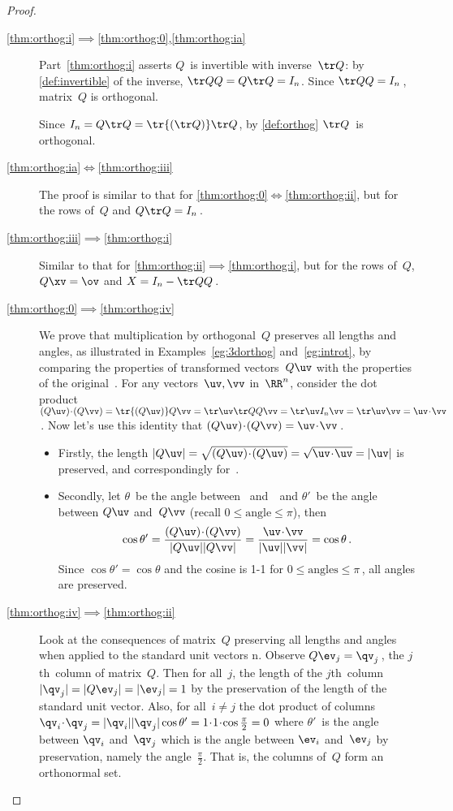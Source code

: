 \begin{proof}
\begin{description}
\item[\ref{thm:orthog:i}$\implies$\ref{thm:orthog:0},\ref{thm:orthog:ia}]
Part~\ref{thm:orthog:i} asserts \(Q\)~is invertible with inverse~\(\tr Q\): by \autoref{def:invertible} of the inverse, \(\tr QQ=Q\tr Q=I_n\).  
Since \(\tr QQ=I_n\)\,, matrix~\(Q\) is orthogonal.
 
Since \(I_n=Q\tr Q=\tr{(\tr Q)}\tr Q\), by \autoref{def:orthog} \(\tr Q\)~is orthogonal.

\item[\ref{thm:orthog:ia}$\iff$\ref{thm:orthog:iii}] 
The proof is similar to that for \ref{thm:orthog:0}$\iff$\ref{thm:orthog:ii}, but for the rows of~\(Q\) and \(Q\tr Q=I_n\)\,.

\item[\ref{thm:orthog:iii}$\implies$\ref{thm:orthog:i}] 
Similar to that for \ref{thm:orthog:ii}$\implies$\ref{thm:orthog:i}, but for the rows of~\(Q\), \(Q\xv=\ov\) and \(X=I_n-\tr QQ\)\,.

\item[\ref{thm:orthog:0}$\implies$\ref{thm:orthog:iv}] 
We prove that multiplication by orthogonal~\(Q\) preserves all lengths and angles, as illustrated in Examples~\ref{eg:3dorthog} and~\ref{eg:introt}, by comparing the properties of transformed vectors~\(Q\uv\) with the properties of the original~\uv.
For any vectors~\(\uv,\vv\) in~\(\RR^n\), consider the dot product
\((Q\uv)\cdot(Q\vv)=\tr{(Q\uv)}Q\vv
=\tr\uv\tr QQ\vv
=\tr\uv I_n\vv
=\tr\uv\vv=\uv\cdot\vv\)\,.  
Now let's use this identity that \((Q\uv)\cdot(Q\vv)=\uv\cdot\vv\)\,.
\begin{itemize}
\item Firstly, the length \(|Q\uv|=\sqrt{(Q\uv)\cdot(Q\uv)}=\sqrt{\uv\cdot\uv}=|\uv|\) is preserved, and correspondingly for~\vv.
\item Secondly, let \(\theta\)~be the angle between \uv\ and~\vv\ and \(\theta'\)~be the angle between \(Q\uv\) and~\(Q\vv\) (recall \(0\leq\text{angle}\leq\pi\)), then
\begin{equation*}
\cos\theta'=\frac{(Q\uv)\cdot(Q\vv)}{|Q\uv||Q\vv|}
=\frac{\uv\cdot \vv}{|\uv||\vv|}
=\cos\theta\,.
\end{equation*}
Since \(\cos\theta'=\cos\theta\) and the cosine is 1-1 for \(0\leq\text{angles}\leq\pi\)\,, all angles are preserved.
\end{itemize}

\item[\ref{thm:orthog:iv}$\implies$\ref{thm:orthog:ii}]
Look at the consequences of matrix~\(Q\) preserving all lengths and angles when applied to the standard unit vectors \hlist\ev n.
Observe \(Q\ev_j=\qv_j\)\,, the \(j\)th~column of matrix~\(Q\).
Then for all~\(j\), the length of the \(j\)th~column \(|\qv_j|=|Q\ev_j|=|\ev_j|=1\) by the preservation of the length of the standard unit vector.
Also, for all~\(i\neq j\) the dot product of columns \(\qv_i\cdot\qv_j=|\qv_i||\qv_j|\cos\theta'=1\cdot1\cdot\cos\frac\pi2=0\) where \(\theta'\)~is the angle between \(\qv_i\) and~\(\qv_j\) which is the angle between \(\ev_i\) and~\(\ev_j\) by preservation, namely the angle~\(\frac\pi2\).
That is, the columns of~\(Q\) form an orthonormal set. 


\end{description}
\end{proof}
